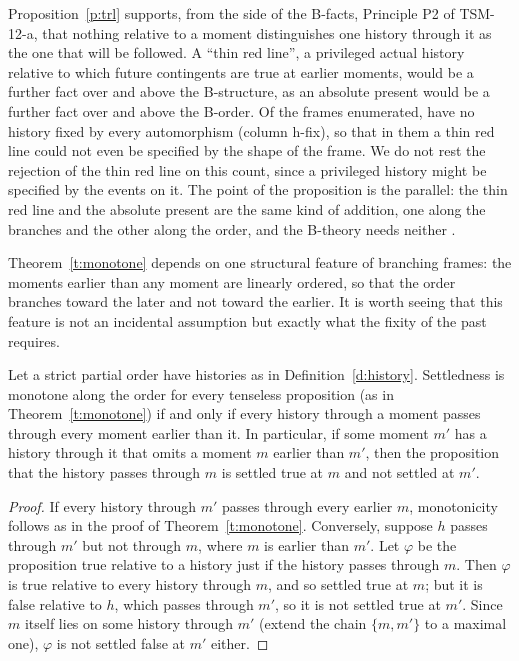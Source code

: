 \documentclass{situationist-preprint}
\begin{document}
Proposition~\ref{p:trl} supports, from the side of the B-facts, Principle P2 of TSM-12-a, that nothing relative to a moment distinguishes one history through it as the one that will be followed. A \enquote{thin red line}, a privileged actual history relative to which future contingents are true at earlier moments, would be a further fact over and above the B-structure, as an absolute present would be a further fact over and above the B-order. Of the \NFrames{} frames enumerated, \NNoFixH{} have no history fixed by every automorphism (column h-fix), so that in them a thin red line could not even be specified by the shape of the frame. We do not rest the rejection of the thin red line on this count, since a privileged history might be specified by the events on it. The point of the proposition is the parallel: the thin red line and the absolute present are the same kind of addition, one along the branches and the other along the order, and the B-theory needs neither \citep{BelnapGreen1994,MacFarlane2003}.

Theorem~\ref{t:monotone} depends on one structural feature of branching frames: the moments earlier than any moment are linearly ordered, so that the order branches toward the later and not toward the earlier. It is worth seeing that this feature is not an incidental assumption but exactly what the fixity of the past requires.

\begin{proposition}\label{p:converse}
Let a strict partial order have histories as in Definition~\ref{d:history}. Settledness is monotone along the order for every tenseless proposition (as in Theorem~\ref{t:monotone}) if and only if every history through a moment passes through every moment earlier than it. In particular, if some moment $m'$ has a history through it that omits a moment $m$ earlier than $m'$, then the proposition that the history passes through $m$ is settled true at $m$ and not settled at $m'$.
\end{proposition}

\begin{proof}
If every history through $m'$ passes through every earlier $m$, monotonicity follows as in the proof of Theorem~\ref{t:monotone}. Conversely, suppose $h$ passes through $m'$ but not through $m$, where $m$ is earlier than $m'$. Let $\varphi$ be the proposition true relative to a history just if the history passes through $m$. Then $\varphi$ is true relative to every history through $m$, and so settled true at $m$; but it is false relative to $h$, which passes through $m'$, so it is not settled true at $m'$. Since $m$ itself lies on some history through $m'$ (extend the chain $\{m, m'\}$ to a maximal one), $\varphi$ is not settled false at $m'$ either.
\end{proof}
\end{document}
